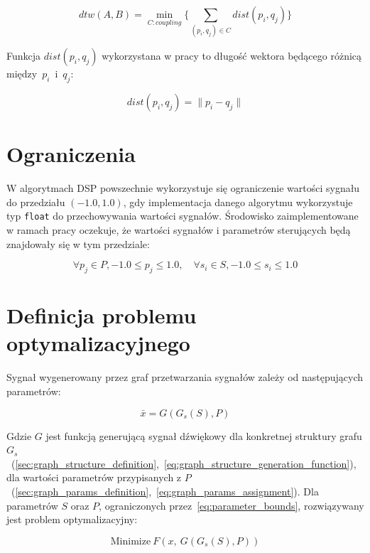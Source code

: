\begin{equation}
  dtw(A,B) = \min_{C: coupling} \{ \sum_{(p_i, q_j) \in C} dist(p_i, q_j) \}
  \label{eq:dtw_distance}
\end{equation}

Funkcja $dist(p_i, q_j)$ wykorzystana w pracy to długość wektora będącego 
różnicą między~$p_i$~i~$q_j$:

\begin{equation}
  dist(p_i, q_j) = \|p_i - q_j\|
  \label{eq:dtw_dist_function}
\end{equation}

\section{Ograniczenia}

W algorytmach DSP powszechnie wykorzystuje się ograniczenie wartości
sygnału do przedziału $(-1.0, 1.0)$, gdy implementacja danego algorytmu wykorzystuje 
typ \texttt{float} do przechowywania wartości sygnałów. Środowisko zaimplementowane
w ramach pracy oczekuje, że wartości sygnałów i parametrów sterujących
będą znajdowały się w tym przedziale:

\begin{equation}
  \forall p_j \in P,  -1.0 \leq p_j \leq 1.0, \quad \forall s_i \in S, -1.0 \leq s_i \leq 1.0
  \label{eq:parameter_bounds}
\end{equation}

\section{Definicja problemu optymalizacyjnego}

Sygnał wygenerowany przez graf przetwarzania sygnałów zależy od następujących parametrów:

\begin{equation}
  \bar{x} = G(G_s(S), P)
  \label{eq:graph_generated_signal}
\end{equation}

\noindent
Gdzie $G$ jest funkcją generującą sygnał dźwiękowy dla konkretnej struktury grafu
$G_s$~(\ref{sec:graph_structure_definition},~\ref{eq:graph_structure_generation_function}),
dla wartości parametrów przypisanych z
$P$~(\ref{sec:graph_params_definition},~\ref{eq:graph_params_assignment}).
Dla parametrów $S$ oraz $P$, ograniczonych przez~\ref{eq:parameter_bounds},
rozwiązywany jest problem optymalizacyjny:

\begin{equation}
  \text{Minimize}~F(x,~G(G_s(S), P))
  \label{eq:target_function}
\end{equation}

